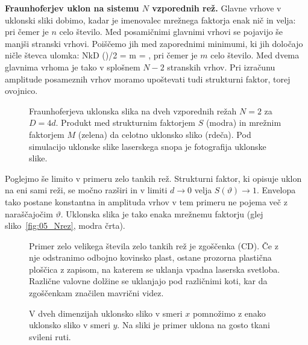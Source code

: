 \begin{example}{\bf Fraunhoferjev uklon na sistemu $N$ vzporednih rež.}
Glavne vrhove v uklonski sliki dobimo, kadar je imenovalec mrežnega faktorja enak nič in velja:
pri čemer je $n$ celo število. Med posamičnimi glavnimi vrhovi se pojavijo še manjši
stranski vrhovi. Poiščemo jih med zaporednimi minimumi, ki jih določajo ničle števca
ulomka:
\beq
NkD \sin(\vartheta)/2 = m\pi \qquad {} \qquad \sin \vartheta = ,
\label{eq:05_29}
\eeq
pri čemer je $m$ celo število. Med dvema glavnima vrhoma je tako v splošnem
$N-2$ stranskih vrhov. Pri izračunu amplitude posameznih vrhov moramo upoštevati
tudi strukturni faktor, torej ovojnico.
\begin{figure}[ht]
\centering
\def\svgwidth{140truemm} 

\caption{Fraunhoferjeva uklonska slika na dveh vzporednih režah $N=2$ za $D=4d$. 
Produkt med strukturnim faktorjem $S$ (modra) in mrežnim
faktorjem $M$ (zelena) da celotno uklonsko sliko (rdeča). Pod simulacijo uklonske 
slike laserskega snopa je fotografija uklonske slike.}
\label{fig:05_2rezi}
\end{figure}

Poglejmo še limito v primeru zelo tankih rež. Strukturni faktor, ki opisuje uklon na 
eni sami reži, se močno razširi in v limiti $d\to 0$ velja $S(\vartheta) \to 1$. Envelopa
tako postane konstantna in amplituda vrhov v tem primeru ne pojema več z naraščajočim 
$\vartheta$. Uklonska slika je tako enaka mrežnemu faktorju (glej sliko~\ref{fig:05_Nrez}, modra črta).
\begin{figure}[ht]
\centering
\caption{Primer zelo velikega števila zelo tankih rež je zgoščenka (CD). Če z nje odstranimo
odbojno kovinsko plast, ostane prozorna plastična ploščica z zapisom, na katerem se uklanja 
vpadna laserska svetloba. Različne valovne dolžine se uklanjajo pod različnimi koti, kar
da zgoščenkam značilen mavrični videz.}
\label{fig:05_uklon_cd}
\end{figure}

\begin{figure}[ht]
\centering
\caption{V dveh dimenzijah uklonsko sliko v smeri $x$ pomnožimo z enako uklonsko sliko v smeri $y$.
Na sliki je primer uklona na gosto tkani svileni ruti.}
\label{fig:05_uklon_ruta}
\end{figure}




\end{example}

